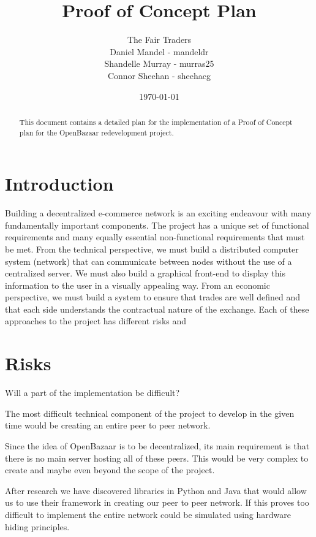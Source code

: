 \documentclass{article}
\begin{document}
\title{Proof of Concept Plan}
\author{The Fair Traders \\ Daniel Mandel - mandeldr \\ Shandelle Murray - murras25 \\ Connor Sheehan - sheehacg}
\date{\today}
\maketitle

\begin{abstract}
This document contains a detailed plan for the implementation of a Proof of Concept plan for the OpenBazaar redevelopment project.
\end{abstract}

\section{Introduction}
Building a decentralized e-commerce network is an exciting endeavour with many fundamentally important components. The project has a unique set of functional requirements and many equally essential non-functional requirements that must be met. From the technical perspective, we must build a distributed computer system (network) that can communicate between nodes without the use of a centralized server. We must also build a graphical front-end to display this information to the user in a visually appealing way. From an economic perspective, we must build a system to ensure that trades are well defined and that each side understands the contractual nature of the exchange. Each of these approaches to the project has different risks and 

\section{Risks}
Will a part of the implementation be difficult?

The most difficult technical component of the project to develop in the given time would be creating an entire peer to peer network.

Since the idea of OpenBazaar is to be decentralized, its main requirement is that there is no main server hosting all of these peers. This would be very complex to create and maybe even beyond the scope of the project.

After research we have discovered libraries in Python and Java that would allow us to use their framework in creating our peer to peer network. If this proves too difficult to implement the entire network could be simulated using hardware hiding principles.
\end{document}
